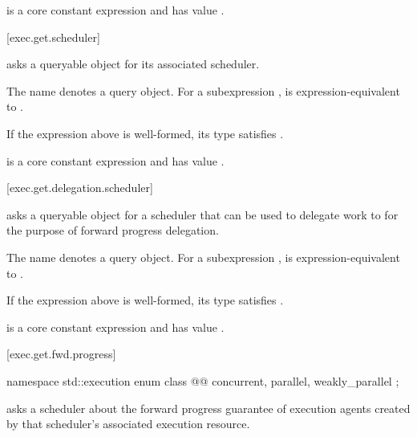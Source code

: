 \pnum
{} is
a core constant expression and has value .

[exec.get.scheduler]{}

\pnum
{} asks a queryable object for its associated scheduler.

\pnum
The name  denotes a query object.
For a subexpression ,
 is expression-equivalent to
.

\mandates
If the expression above is well-formed,
its type satisfies .

\pnum
{} is
a core constant expression and has value .

[exec.get.delegation.scheduler]{}

\pnum
{} asks a queryable object for a scheduler
that can be used to delegate work to
for the purpose of forward progress delegation.

\pnum
The name  denotes a query object.
For a subexpression ,
 is expression-equivalent to
.

\mandates
If the expression above is well-formed,
its type satisfies .

\pnum
{} is
a core constant expression and has value .

[exec.get.fwd.progress]{}

\begin{codeblock}
namespace std::execution {
  enum class @@ {
    concurrent,
    parallel,
    weakly_parallel
  };
}
\end{codeblock}

\pnum
{} asks a scheduler about
the forward progress guarantee of execution agents
created by that scheduler's associated execution resource.


